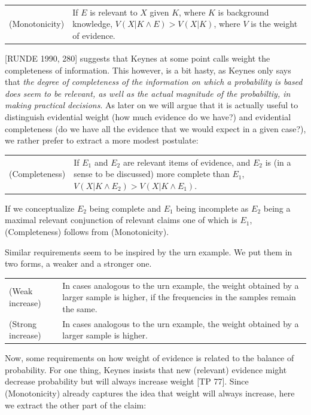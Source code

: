 \documentclass[
  10pt,
  dvipsnames,enabledeprecatedfontcommands]{scrartcl}
\begin{document}
\begin{tabular}{lp{11cm}}
(Monotonicity) & If $E$ is relevant to $X$ given $K$, where $K$ is background knowledge, $V(X\vert K \wedge E) > V(X\vert K)$, where $V$ is the weight of evidence.
\end{tabular}

{[}RUNDE 1990, 280{]} suggests that Keynes at some point calls weight
the completeness of information. This however, is a bit hasty, as Keynes
only says that
\emph{the degree of completeness of the information on which a probability is based does seem to be relevant, as well as the actual magnitude of the probabiltiy, in making practical decisions}.
As later on we will argue that it is actually useful to distinguish
evidential weight (how much evidence do we have?) and evidential
completeness (do we have all the evidence that we would expect in a
given case?), we rather prefer to extract a more modest postulate:

\begin{tabular}{lp{11cm}}
(Completeness) & If $E_1$ and $E_2$ are relevant items of evidence, and $E_2$ is (in a sense to be discussed) more complete than $E_1$,  $V(X\vert K \wedge E_2) > V(X\vert K \wedge E_1)$.
\end{tabular}

\noindent If we conceptualize \(E_2\) being complete and \(E_1\) being
incomplete as \(E_2\) being a maximal relevant conjunction of relevant
claims one of which is \(E_1\), (Completeness) follows from
(Monotonicity).

Similar requirements seem to be inspired by the urn example. We put them
in two forms, a weaker and a stronger one.

\begin{tabular}{lp{11cm}}
  (Weak increase) & In cases analogous to the urn example, the weight obtained by a larger sample is higher, if the frequencies in the samples remain the same.\\
  (Strong increase) & In cases analogous to the urn example, the weight obtained by a larger sample is higher.
  \end{tabular}

Now, some requirements on how weight of evidence is related to the
balance of probability. For one thing, Keynes insists that new
(relevant) evidence might decrease probability but will always increase
weight {[}TP 77{]}. Since (Monotonicity) already captures the idea that
weight will always increase, here we extract the other part of the
claim:
\end{document}
